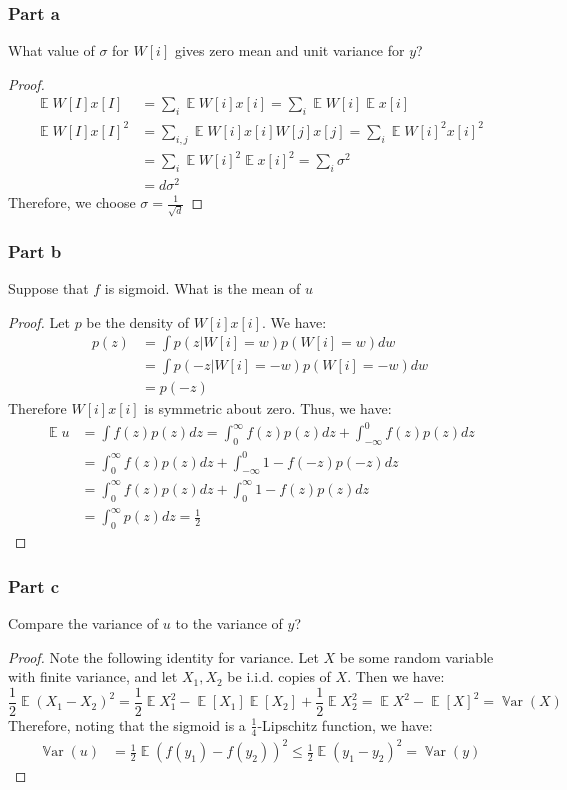 \documentclass{amsart}
\DeclareMathOperator{\Var}{\mathbb{V}ar}  %
\DeclareMathOperator{\ee}{\mathbb{E}}
\theoremstyle{definition}
\begin{document}
\subsubsection*{Part a} What value of $\sigma$ for $W[i]$ gives zero mean and unit variance for $y$?
\begin{proof}
  \begin{align*}
    \ee{W[I]x[I]} &= \sum_{i} \ee{W[i]x[i]} = \sum_{i} \ee{W[i]}\ee{x[i]}\\
    \ee{W[I]x[I]^2} &= \sum_{i,j} \ee{W[i]x[i]W[j]x[j]} = \sum_{i} \ee{W[i]^2x[i]^2} \\
    &= \sum_{i} \ee{W[i]^2}\ee{x[i]^2} = \sum_{i} \sigma^2\\
    &= d \sigma^2
  \end{align*}
  Therefore, we choose $\sigma = \frac1{\sqrt{d}}$
\end{proof}
\subsubsection*{Part b} Suppose that $f$ is sigmoid. What is the mean of $u$
\begin{proof}
  Let $p$ be the density of $W[i]x[i]$. We have:
  \begin{align*}
    p(z) &= \int p(z | W[i] = w) p(W[i] = w) dw \\
    &= \int p(-z | W[i] = - w) p(W[i] = -w) dw \\
    &= p(-z)
  \end{align*}
  Therefore $W[i]x[i]$ is symmetric about zero. Thus, we have:
  \begin{align*}
    \ee{u} &= \int f(z) p(z) dz  = \int_0^\infty f(z) p(z) dz + \int_{-\infty}^0 f(z) p(z) dz \\ 
    &= \int_0^\infty f(z) p(z) dz + \int_{-\infty}^ 0 1 - f(-z) p(-z) dz \\
    &= \int_0^\infty f(z) p(z) dz + \int_0^\infty 1 - f(z) p(z) dz \\
    &= \int_0^\infty p(z) dz = \frac12
  \end{align*}
\end{proof}

\subsubsection*{Part c} Compare the variance of $u$ to the variance of $y$?
\begin{proof}
  Note the following identity for variance. Let $X$ be some random variable with finite variance, and let $X_1, X_2$ be i.i.d. copies of $X$. Then we have:
  \[
  \frac12 \ee{(X_1 - X_2)^2 } = \frac12 \ee{X_1^2} - \ee[X_1]\ee[X_2] + \frac12 \ee{X_2^2} = \ee{X^2} - \ee[X]^2 = \Var(X)
  \]
  Therefore, noting that the sigmoid is a $\frac14$-Lipschitz function, we have:
  \begin{align*}
    \Var(u) &= \frac12 \ee{(f(y_1) - f(y_2))^2} \le \frac12 \ee{(y_1 - y_2)^2} = \Var(y)
  \end{align*}
\end{proof}
\end{document}
